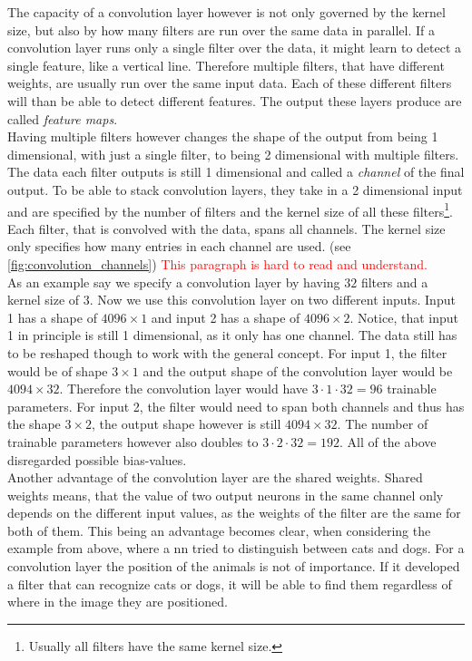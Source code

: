 The capacity of a convolution layer however is not only governed by the kernel size, but also by how many filters are run over the same data in parallel. If a convolution layer runs only a single filter over the data, it might learn to detect a single feature, like a vertical line. Therefore multiple filters, that have different weights, are usually run over the same input data. Each of these different filters will than be able to detect different features. The output these layers produce are called \emph{feature maps}.\\
Having multiple filters however changes the shape of the output from being 1 dimensional, with just a single filter, to being 2 dimensional with multiple filters. The data each filter outputs is still 1 dimensional and called a \emph{channel} of the final output. To be able to stack convolution layers, they take in a 2 dimensional input and are specified by the number of filters and the kernel size of all these filters\footnote{Usually all filters have the same kernel size.}. Each filter, that is convolved with the data, spans all channels. The kernel size only specifies how many entries in each channel are used. (see \autoref{fig:convolution_channels}) \textcolor{red}{This paragraph is hard to read and understand.}\\
As an example say we specify a convolution layer by having $32$ filters and a kernel size of $3$. Now we use this convolution layer on two different inputs. Input 1 has a shape of $4096\times 1$ and input 2 has a shape of $4096\times 2$. Notice, that input 1 in principle is still 1 dimensional, as it only has one channel. The data still has to be reshaped though to work with the general concept. For input 1, the filter would be of shape $3\times 1$ and the output shape of the convolution layer would be $4094\times 32$. Therefore the convolution layer would have $3\cdot 1\cdot 32=96$ trainable parameters. For input 2, the filter would need to span both channels and thus has the shape $3\times 2$, the output shape however is still $4094\times 32$. The number of trainable parameters however also doubles to $3\cdot 2\cdot 32=192$. All of the above disregarded possible bias-values.\medskip\\
Another advantage of the convolution layer are the shared weights. Shared weights means, that the value of two output neurons in the same channel only depends on the different input values, as the weights of the filter are the same for both of them. This being an advantage becomes clear, when considering the example from above, where a \gls{nn} tried to distinguish between cats and dogs. For a convolution layer the position of the animals is not of importance. If it developed a filter that can recognize cats or dogs, it will be able to find them regardless of where in the image they are positioned.\\
